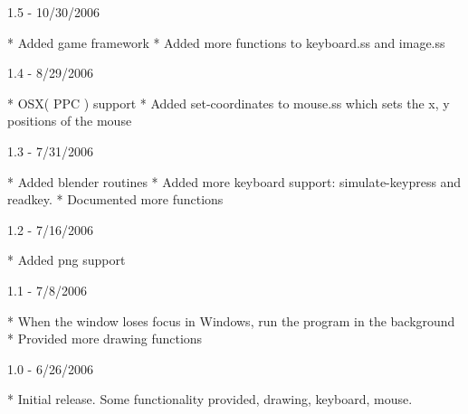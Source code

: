 1.5 - 10/30/2006

* Added game framework\newline
* Added more functions to keyboard.ss and image.ss\newline

1.4 - 8/29/2006

* OSX( PPC ) support\newline
* Added set-coordinates to mouse.ss which sets the x, y positions of the mouse\newline

1.3 - 7/31/2006

* Added blender routines\newline
* Added more keyboard support: simulate-keypress and readkey.\newline
* Documented more functions\newline

1.2 - 7/16/2006

* Added png support\newline

1.1 - 7/8/2006

* When the window loses focus in Windows, run the program in the background\newline
* Provided more drawing functions\newline

1.0 - 6/26/2006

* Initial release. Some functionality provided, drawing, keyboard, mouse.\newline
